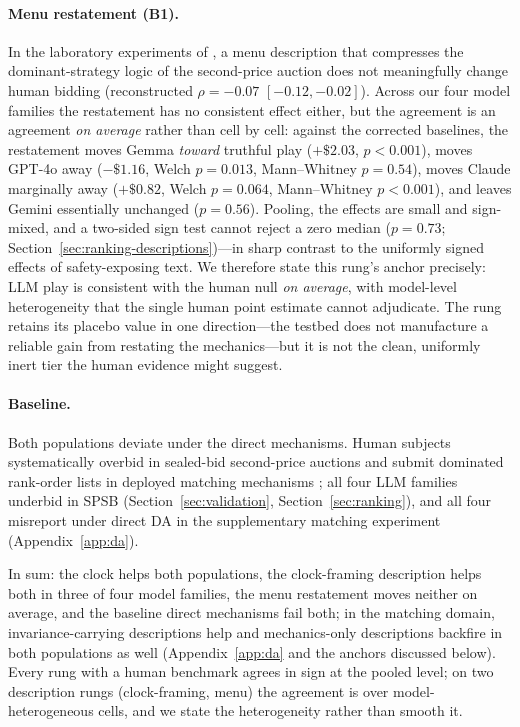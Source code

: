 \paragraph{Menu restatement (B1).} In the laboratory experiments of \citet{gonczarowski2023strategyproofness}, a menu description that compresses the dominant-strategy logic of the second-price auction does not meaningfully change human bidding (reconstructed $\rho=-0.07$ $[-0.12,-0.02]$). Across our four model families the restatement has no consistent effect either, but the agreement is an agreement \emph{on average} rather than cell by cell: against the corrected baselines, the restatement moves Gemma \emph{toward} truthful play ($+\$2.03$, $p<0.001$), moves GPT-4o away ($-\$1.16$, Welch $p=0.013$, Mann--Whitney $p=0.54$), moves Claude marginally away ($+\$0.82$, Welch $p=0.064$, Mann--Whitney $p<0.001$), and leaves Gemini essentially unchanged ($p=0.56$). Pooling, the effects are small and sign-mixed, and a two-sided sign test cannot reject a zero median ($p=0.73$; Section~\ref{sec:ranking-descriptions})---in sharp contrast to the uniformly signed effects of safety-exposing text. We therefore state this rung's anchor precisely: LLM play is consistent with the human null \emph{on average}, with model-level heterogeneity that the single human point estimate cannot adjudicate. The rung retains its placebo value in one direction---the testbed does not manufacture a reliable gain from restating the mechanics---but it is not the clean, uniformly inert tier the human evidence might suggest.

\paragraph{Baseline.} Both populations deviate under the direct mechanisms. Human subjects systematically overbid in sealed-bid second-price auctions \citep{kagel1993independent, kagel1995individual} and submit dominated rank-order lists in deployed matching mechanisms \citep{rees2018suboptimal}; all four LLM families underbid in SPSB (Section~\ref{sec:validation}, Section~\ref{sec:ranking}), and all four misreport under direct DA in the supplementary matching experiment (Appendix~\ref{app:da}).

In sum: the clock helps both populations, the clock-framing description helps both in three of four model families, the menu restatement moves neither on average, and the baseline direct mechanisms fail both; in the matching domain, invariance-carrying descriptions help and mechanics-only descriptions backfire in both populations as well (Appendix~\ref{app:da} and the anchors discussed below). Every rung with a human benchmark agrees in sign at the pooled level; on two description rungs (clock-framing, menu) the agreement is over model-heterogeneous cells, and we state the heterogeneity rather than smooth it.

